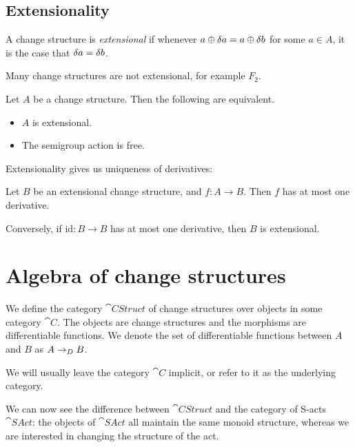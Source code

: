 \subsection{Extensionality}

\begin{defn}[Extensionality]
  A change structure is \textit{extensional} if whenever $a \oplus \delta a
  = a \oplus \delta b$ for some $a \in A$, it is the case that $\delta a = \delta b$.
\end{defn}

Many change structures are not extensional, for example $F_2$.

\begin{prop}
  Let $A$ be a change structure. Then the following are equivalent.
  \begin{itemize}
    \item $A$ is extensional.
    \item The semigroup action is free.
  \end{itemize}
\end{prop}

Extensionality gives us uniqueness of derivatives:
\begin{prop}
  Let $B$ be an extensional change structure, and $f: A \rightarrow B$. Then $f$ has at
  most one derivative.

  Conversely, if $\textrm{id}: B \rightarrow B$ has at most one derivative, then
  $B$ is extensional.
\end{prop}

\section{Algebra of change structures}
\label{sec:algebra}

\begin{defn}
  We define the category $\cat{CStruct}$ of change structures over objects in
  some category $\cat{C}$. The objects are
  change structures and the morphisms are differentiable functions. We denote
  the set of differentiable functions between $A$ and $B$ as $A \rightarrow_{D} B$.
  
  We will usually leave the category $\cat{C}$ implicit, or refer to it as the
  underlying category.
\end{defn}

We can now see the difference between $\cat{CStruct}$ and the category of
S-acts $\cat{SAct}$: the objects of $\cat{SAct}$ all maintain the same monoid
structure, whereas we are interested in changing the structure of the act.

